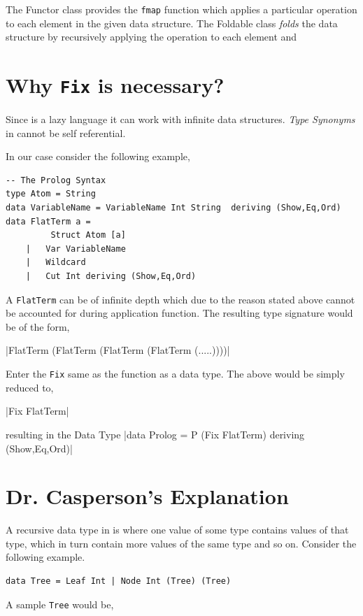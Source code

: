 \documentclass[thesis-solanki.tex]{subfiles}
\begin{document}
The Functor class provides the \texttt{fmap} function which applies a particular operation to each element in the given data structure. The Foldable class \textit{folds} the data structure by recursively applying the operation to each element and 

\section{Why \texttt{Fix} is necessary?}
Since  is a lazy language it can work with infinite data structures. \textit{Type Synonyms} in  cannot be self 
referential.


 

In our case consider the following example,

\begin{verbatim}
-- The Prolog Syntax
type Atom = String
data VariableName = VariableName Int String  deriving (Show,Eq,Ord)
data FlatTerm a = 
		 Struct Atom [a]
	|	Var VariableName
	|	Wildcard
	|	Cut Int deriving (Show,Eq,Ord)
\end{verbatim} 
 
A \texttt{FlatTerm} can be of infinite depth which due to the reason stated above cannot be accounted for during application function. The resulting type signature would be of the form,

|FlatTerm (FlatTerm (FlatTerm (FlatTerm (.....))))|

Enter the \texttt{Fix} same as the function as a data type. The above would be simply reduced to,

|Fix FlatTerm|   

resulting in the  Data Type
|data Prolog = P (Fix FlatTerm) deriving (Show,Eq,Ord)|

\section{Dr. Casperson's Explanation}

A recursive data type in  is where one value of some type contains values of that type, which in turn contain more values of the same type 
and so on. Consider the following example.

\begin{verbatim}
data Tree = Leaf Int | Node Int (Tree) (Tree)
\end{verbatim} 

A sample \texttt{Tree} would be,
\end{document}
